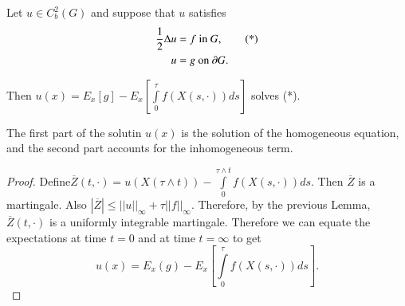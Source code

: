 \begin{theorem*}
Let $u\in C^{2}_{b}(G)$ and suppose that $u$ satisfies
\begin{align*}
\frac{1}{2}\Delta u &= f\text{~ in~ }G,\tag{*}\\
u &= g\text{~ on~ } \partial G.
\end{align*}

Then $u(x)=E_{x}[g]-E_{x}[\int\limits^{\tau}_{0}f(X(s,\cdot))ds]$
solves (*).
\end{theorem*}

\begin{remark*}
The first part of the solutin $u(x)$ is the solution of the
homogeneous equation, and the second part accounts for the
inhomogeneous term.
\end{remark*}

\begin{proof}
Define\pageoriginale $\overline{Z}(t,\cdot)=u(X(\tau\wedge
t))-\int\limits^{\tau\wedge t}_{0}f(X(s,\cdot))ds$. Then
$\overline{Z}$ is a martingale. Also $|\overline{Z}|\leq
||u||_{\infty}+\tau||f||_{\infty}$. Therefore, by the previous Lemma,
$\overline{Z}(t,\cdot)$ is a uniformly integrable
martingale. Therefore we can equate the expectations at time $t=0$ and
at time $t=\infty$ to get
$$
u(x)=E_{x}(g)-E_{x}[\int\limits^{\tau}_{0}f(X(s,\cdot))ds].
$$
\end{proof}



